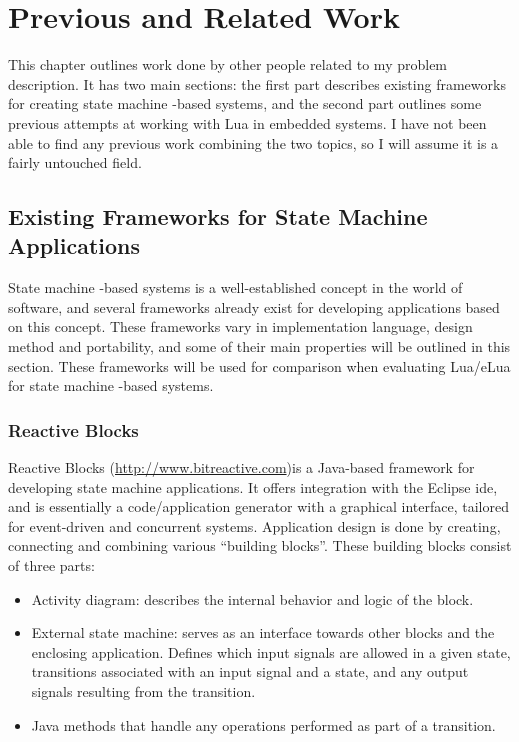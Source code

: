 \chapter{Previous and Related Work}
\label{ch:related_work}
This chapter outlines work done by other people related to my problem description. It has two main sections: the first part describes existing frameworks for creating state machine -based systems, and the second part outlines some previous attempts at working with Lua in embedded systems. I have not been able to find any previous work combining the two topics, so I will assume it is a fairly untouched field.

\section{Existing Frameworks for State Machine Applications}
\label{sec:existing_frameworks_state_machine}
State machine -based systems is a well-established concept in the world of software, and several frameworks already exist for developing applications based on this concept. These frameworks vary in implementation language, design method and portability, and some of their main properties will be outlined in this section. These frameworks will be used for comparison when evaluating Lua/eLua for state machine -based systems.

\subsection{Reactive Blocks}
\label{sec:reactive_blocks}
Reactive Blocks (\url{http://www.bitreactive.com})is a Java-based framework for developing state machine applications. It offers integration with the Eclipse \gls{ide}, and is essentially a code/application generator with a graphical interface, tailored for event-driven and concurrent systems. Application design is done by creating, connecting and combining various ``building blocks''. These building blocks consist of three parts:
\begin{itemize}
	\item Activity diagram: describes the internal behavior and logic of the block.
	\item External state machine: serves as an interface towards other blocks and the enclosing application. Defines which input signals are allowed in a given state, transitions associated with an input signal and a state, and any output signals resulting from the transition.
	\item Java methods that handle any operations performed as part of a transition.
\end{itemize}

